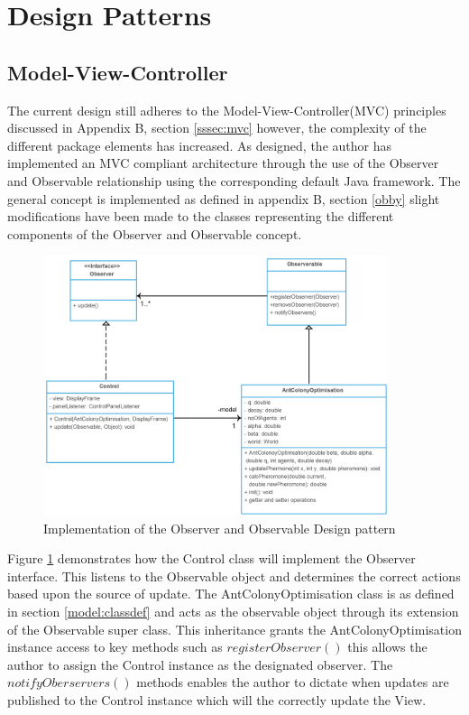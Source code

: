 \section{Design Patterns}
\subsection{Model-View-Controller}
The current design still adheres to the Model-View-Controller(MVC) principles discussed in Appendix B, section \ref{sssec:mvc} however, the complexity of the different package elements has increased. As designed, the author has implemented an MVC compliant architecture through the use of the Observer and Observable relationship using the corresponding default Java framework. The general concept is implemented as defined in appendix B, section \ref{obby} slight modifications have been made to the classes representing the different components of the Observer and Observable concept.

\begin{figure}[H]
\centering
\includegraphics[width=0.9\textwidth]{Images/chapter4/observerImplemetation}
\caption[Observer and Observable Implementation]{Implementation of the Observer and Observable Design pattern}
\label{fig:observableImp}
\end{figure}

Figure \ref{fig:observableImp} demonstrates how the Control class will implement the Observer interface. This listens to the Observable object and determines the correct actions based upon the source of update. The AntColonyOptimisation class is as defined in section \ref{model:classdef} and acts as the observable object through its extension of the Observable super class. This inheritance grants the AntColonyOptimisation instance access to key methods such as $registerObserver()$ this allows the author to assign the Control instance as the designated observer. The $notifyOberservers()$ methods enables the author to dictate when updates are published to the Control instance which will the correctly update the View.

